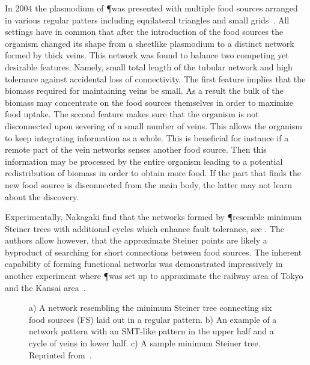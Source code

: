 			In 2004 the plasmodium of \P was presented with multiple food sources arranged in various regular patters including equilateral triangles and small grids~\cite{Nakagaki20041,nakagaki2004obtaining}. All settings have in common that after the introduction of the food sources the organism changed its shape from a sheetlike plasmodium to a distinct network formed by thick veins. This network was found to balance two competing yet desirable features. Namely, small total length of the tubular network and high tolerance against accidental loss of connectivity. The first feature implies that the biomass required for maintaining veins be small. As a result the bulk of the biomass may concentrate on the food sources themselves in order to maximize food uptake. The second feature makes sure that the organism is not disconnected upon severing of a small number of veins. This allows the organism to keep integrating information as a whole. This is beneficial for instance if a remote part of the vein networks senses another food source. Then this information may be processed by the entire organism leading to a potential redistribution of biomass in order to obtain more food. If the part that finds the new food source is disconnected from the main body, the latter may not learn about the discovery.

			Experimentally, Nakagaki \etal find that the networks formed by \P resemble minimum Steiner trees with additional cycles which enhance fault tolerance, see . The authors allow however, that the approximate Steiner points are likely a byproduct of searching for short connections between food sources. The inherent capability of forming functional networks was demonstrated impressively in another experiment where \P was set up to approximate the railway area of Tokyo and the Kansai area~\cite{tero2010rules}.

			\begin{figure}
				\centering
				\caption[Network of food sources by \P]{ a) A network resembling the minimum Steiner tree connecting six food sources (FS) laid out in a regular pattern. b) An example of a network pattern with an SMT-like pattern in the upper half and a cycle of veins in lower half. c) A sample minimum Steiner tree. Reprinted from~\cite{nakagaki2004obtaining}.}
				\label{fig:steiner_tree_experiment}
			\end{figure}

